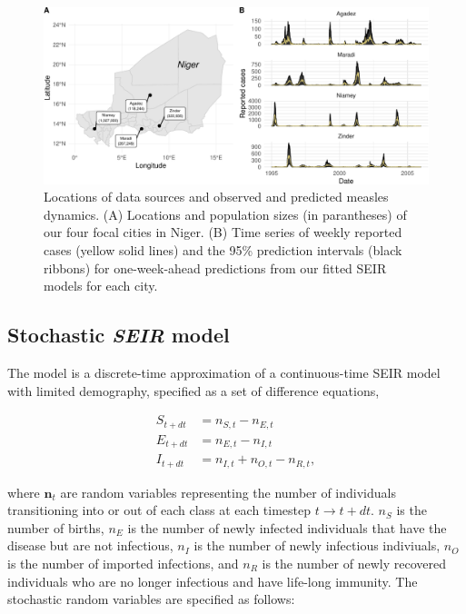 \documentclass[3p]{elsarticle} %
\makeatletter
\def\maxwidth{\ifdim\Gin@nat@width>\linewidth\linewidth
\else\Gin@nat@width\fi}
\let\Oldincludegraphics\includegraphics
\renewcommand{\includegraphics}[1]{\Oldincludegraphics[width=\maxwidth]{#1}}
\makeatother
\begin{document}
\begin{figure}
\centering
\includegraphics{measles-ews-manuscript_files/figure-latex/data-plot-1.pdf}
\caption{Locations of data sources and observed and predicted measles
dynamics. (A) Locations and population sizes (in parantheses) of our
four focal cities in Niger. (B) Time series of weekly reported cases
(yellow solid lines) and the 95\% prediction intervals (black ribbons)
for one-week-ahead predictions from our fitted SEIR models for each
city. \label{data-plot}}
\end{figure}

\hypertarget{stochastic-seir-model}{%
\subsection{\texorpdfstring{Stochastic \emph{SEIR}
model}{Stochastic SEIR model}}\label{stochastic-seir-model}}

The model is a discrete-time approximation of a continuous-time SEIR
model with limited demography, specified as a set of difference
equations,

\begin{align}
S_{t+dt} &= n_{S,t} - n_{E,t} \\
E_{t+dt} &= n_{E,t} - n_{I,t} \\
I_{t+dt} &= n_{I,t} + n_{O,t} - n_{R,t},
\end{align}

\noindent{}where \(\textbf{n}_t\) are random variables representing the
number of individuals transitioning into or out of each class at each
timestep \(t \rightarrow t+dt\). \(n_{S}\) is the number of births,
\(n_{E}\) is the number of newly infected individuals that have the
disease but are not infectious, \(n_{I}\) is the number of newly
infectious indiviuals, \(n_{O}\) is the number of imported infections,
and \(n_{R}\) is the number of newly recovered individuals who are no
longer infectious and have life-long immunity. The stochastic random
variables are specified as follows:
\end{document}
